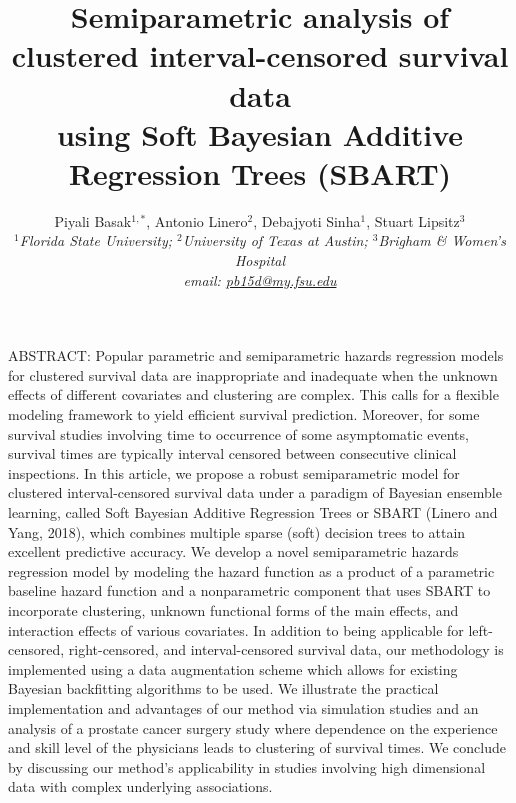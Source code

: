 \documentclass[11pt]{article}
\begin{document}
	\vspace{-10ex}
\title{Semiparametric analysis of clustered interval-censored survival data \\using Soft Bayesian Additive Regression Trees (SBART)}
\author{Piyali Basak$^{1,*}$, Antonio Linero$^{2}$, Debajyoti Sinha$^{1}$, Stuart Lipsitz$^{3}$ \\
	{\small $^{1}$\it Florida State University;
	$^2$\it University of Texas at Austin;
	$^{3}$\it Brigham \& Women's Hospital
	}\\
	{\small \it *email: \href{mailto:pb15d@my.fsu.edu}{pb15d@my.fsu.edu}}}

\date{\vspace{-5ex}}\maketitle
\setlength{\baselineskip}{1.8em}

ABSTRACT: Popular parametric and semiparametric hazards regression models for clustered survival data are inappropriate and inadequate when the unknown effects of different covariates and clustering are complex. This calls for a flexible modeling framework to yield efficient survival prediction. Moreover, for some survival studies involving time to occurrence of some asymptomatic events, survival times are typically interval censored between consecutive clinical inspections.  In this article, we propose a robust semiparametric model for clustered interval-censored survival data under a paradigm of Bayesian ensemble learning, called Soft Bayesian Additive Regression Trees or SBART (Linero and Yang, 2018), which combines multiple  sparse (soft) decision trees to attain excellent predictive accuracy.  We develop a novel  semiparametric hazards regression model by modeling the hazard function as a product of a parametric baseline hazard function and a nonparametric component that uses SBART to incorporate clustering, unknown functional forms of the main effects, and interaction effects of various covariates. In addition to being applicable for left-censored, right-censored, and interval-censored survival data, our methodology is implemented using a data augmentation scheme which allows for existing Bayesian backfitting algorithms to be used. We illustrate the practical implementation and advantages of our method via simulation studies and an analysis of a prostate cancer surgery study where dependence on the experience and skill level of the physicians leads to clustering of  survival times. We conclude by discussing our method's applicability in studies involving high dimensional data with complex underlying associations.
\end{document}
